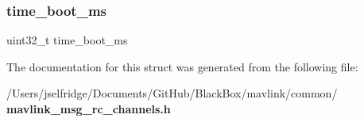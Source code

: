 \subsubsection{time\+\_\+boot\+\_\+ms}
{\footnotesize\ttfamily uint32\+\_\+t time\+\_\+boot\+\_\+ms}



The documentation for this struct was generated from the following file\+:\begin{DoxyCompactItemize}
\item 
/\+Users/jselfridge/\+Documents/\+Git\+Hub/\+Black\+Box/mavlink/common/\textbf{ mavlink\+\_\+msg\+\_\+rc\+\_\+channels.\+h}\end{DoxyCompactItemize}
